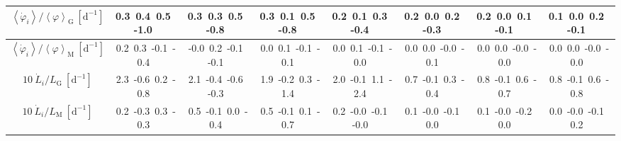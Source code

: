 \begin{table}[H]
{\begin{centering}
\begin{tabular}{|c|c|c|c|c|c|c|c|}
$\left\langle \dot{\varphi}_{i}\right\rangle /\left\langle \varphi\right\rangle _{\mathrm{G}}\ \left[\mathrm{d^{-1}}\right]$ & \textcolor{C1}{0.3}\ \textcolor{C2}{0.4}\ \textcolor{C3}{0.5}\ \textcolor{C4}{-1.0}\  & \textcolor{C1}{0.3}\ \textcolor{C2}{0.3}\ \textcolor{C3}{0.5}\ \textcolor{C4}{-0.8}\  & \textcolor{C1}{0.3}\ \textcolor{C2}{0.1}\ \textcolor{C3}{0.5}\ \textcolor{C4}{-0.8}\  & \textcolor{C1}{0.2}\ \textcolor{C2}{0.1}\ \textcolor{C3}{0.3}\ \textcolor{C4}{-0.4}\  & \textcolor{C1}{0.2}\ \textcolor{C2}{0.0}\ \textcolor{C3}{0.2}\ \textcolor{C4}{-0.3}\  & \textcolor{C1}{0.2}\ \textcolor{C2}{0.0}\ \textcolor{C3}{0.1}\ \textcolor{C4}{-0.1}\  & \textcolor{C1}{0.1}\ \textcolor{C2}{0.0}\ \textcolor{C3}{0.2}\ \textcolor{C4}{-0.1}\  \tabularnewline
\hline
$\left\langle \dot{\varphi}_{i}\right\rangle /\left\langle \varphi\right\rangle _{\mathrm{M}}\ \left[\mathrm{d^{-1}}\right]$ & \textcolor{C1}{0.2}\ \textcolor{C2}{0.3}\ \textcolor{C3}{-0.1}\ \textcolor{C4}{-0.4}\  & \textcolor{C1}{-0.0}\ \textcolor{C2}{0.2}\ \textcolor{C3}{-0.1}\ \textcolor{C4}{-0.1}\  & \textcolor{C1}{0.0}\ \textcolor{C2}{0.1}\ \textcolor{C3}{-0.1}\ \textcolor{C4}{-0.1}\  & \textcolor{C1}{0.0}\ \textcolor{C2}{0.1}\ \textcolor{C3}{-0.1}\ \textcolor{C4}{-0.0}\  & \textcolor{C1}{0.0}\ \textcolor{C2}{0.0}\ \textcolor{C3}{-0.0}\ \textcolor{C4}{-0.1}\  & \textcolor{C1}{0.0}\ \textcolor{C2}{0.0}\ \textcolor{C3}{-0.0}\ \textcolor{C4}{-0.0}\  & \textcolor{C1}{0.0}\ \textcolor{C2}{0.0}\ \textcolor{C3}{-0.0}\ \textcolor{C4}{-0.0}\  \tabularnewline
\hline
$10\ \dot{L}_{i}/L_{\mathrm{G}}\ \left[\mathrm{d^{-1}}\right]$ & \textcolor{C1}{2.3}\ \textcolor{C2}{-0.6}\ \textcolor{C3}{0.2}\ \textcolor{C4}{-0.8}\  & \textcolor{C1}{2.1}\ \textcolor{C2}{-0.4}\ \textcolor{C3}{-0.6}\ \textcolor{C4}{-0.3}\  & \textcolor{C1}{1.9}\ \textcolor{C2}{-0.2}\ \textcolor{C3}{0.3}\ \textcolor{C4}{-1.4}\  & \textcolor{C1}{2.0}\ \textcolor{C2}{-0.1}\ \textcolor{C3}{1.1}\ \textcolor{C4}{-2.4}\  & \textcolor{C1}{0.7}\ \textcolor{C2}{-0.1}\ \textcolor{C3}{0.3}\ \textcolor{C4}{-0.4}\  & \textcolor{C1}{0.8}\ \textcolor{C2}{-0.1}\ \textcolor{C3}{0.6}\ \textcolor{C4}{-0.7}\  & \textcolor{C1}{0.8}\ \textcolor{C2}{-0.1}\ \textcolor{C3}{0.6}\ \textcolor{C4}{-0.8}\  \tabularnewline
\hline
$10\ \dot{L}_{i}/L_{\mathrm{M}}\ \left[\mathrm{d^{-1}}\right]$ & \textcolor{C1}{0.2}\ \textcolor{C2}{-0.3}\ \textcolor{C3}{0.3}\ \textcolor{C4}{-0.3}\  & \textcolor{C1}{0.5}\ \textcolor{C2}{-0.1}\ \textcolor{C3}{0.0}\ \textcolor{C4}{-0.4}\  & \textcolor{C1}{0.5}\ \textcolor{C2}{-0.1}\ \textcolor{C3}{0.1}\ \textcolor{C4}{-0.7}\  & \textcolor{C1}{0.2}\ \textcolor{C2}{-0.0}\ \textcolor{C3}{-0.1}\ \textcolor{C4}{-0.0}\  & \textcolor{C1}{0.1}\ \textcolor{C2}{-0.0}\ \textcolor{C3}{-0.1}\ \textcolor{C4}{0.0}\  & \textcolor{C1}{0.1}\ \textcolor{C2}{-0.0}\ \textcolor{C3}{-0.2}\ \textcolor{C4}{0.0}\  & \textcolor{C1}{0.0}\ \textcolor{C2}{-0.0}\ \textcolor{C3}{-0.1}\ \textcolor{C4}{0.2}\  \tabularnewline

\end{tabular}
\end{centering}}
\end{table}
